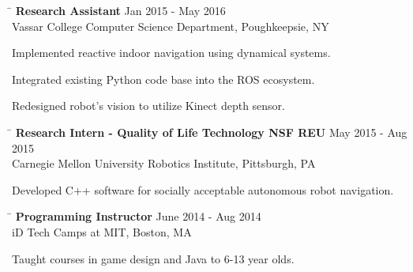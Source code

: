 \documentclass{res}
\begin{document}
\begin{resume}
{    \vspace{-12pt}
    \begin{tabbing}
      \hspace{5.65in}\=  \kill %
      {\bf Research Assistant}
      \>Jan 2015 - May 2016\\
      Vassar College Computer Science Department, Poughkeepsie, NY\\     
    \end{tabbing}
    \vspace{-24pt}      %
    \begin{list}{\bf{-}}{}
      \setlength{\itemsep}{-2pt}
      \item Implemented reactive indoor navigation using dynamical systems.
      \item Integrated existing Python code base into the ROS ecosystem.
      \item Redesigned robot's vision to utilize Kinect depth sensor.
    \end{list}

    \vspace{-12pt}
    \begin{tabbing}
      \hspace{5.65in}\=  \kill %
      {\bf Research Intern - Quality of Life Technology NSF REU}
      \>May 2015 - Aug 2015\\
      Carnegie Mellon University Robotics Institute, Pittsburgh, PA\\     
    \end{tabbing}
    \vspace{-24pt}      %
    \begin{list}{\bf{-}}{}
      \setlength{\itemsep}{-2pt}
      \item Developed C++ software for socially acceptable autonomous robot navigation.
    \end{list}

    \vspace{-12pt}
    \begin{tabbing}
      \hspace{5.65in}\=  \kill %
      {\bf Programming Instructor}
      \>June 2014 - Aug 2014\\
      iD Tech Camps at MIT, Boston, MA\\     
    \end{tabbing}
    \vspace{-24pt}      %
    \begin{list}{\bf{-}}{}
      \setlength{\itemsep}{-2pt}
      \item Taught courses in game design and Java to 6-13 year olds.
    \end{list}
  
}
\end{resume}
\end{document}
